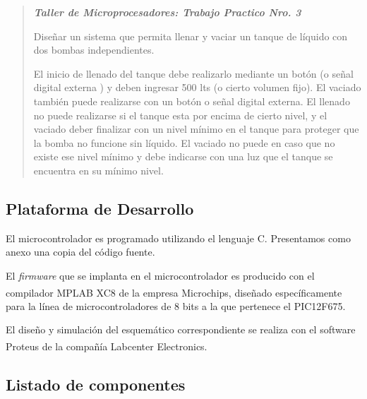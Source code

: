 \documentclass[a4paper]{article}
\let\originalcite\cite
\renewcommand{\cite}[2][]{\textsuperscript{\originalcite{#2}}}
\begin{document}
\begin{quotation}

    \begin{minipage}{\textwidth}

        \begin{center}
            \textit{\textbf{Taller de Microprocesadores: Trabajo 
            Practico Nro. 3}}
        \end{center}

        Diseñar un sistema que permita llenar y vaciar un tanque de líquido 
        con dos bombas independientes. 

        El inicio de llenado del tanque debe realizarlo mediante un botón 
        (o señal digital externa ) y deben ingresar 500 lts (o cierto volumen 
        fijo). El vaciado también puede realizarse con un botón o señal 
        digital externa. El llenado no puede realizarse si el tanque esta por 
        encima de cierto nivel, y el vaciado deber finalizar con un nivel 
        mínimo en el tanque para proteger que la bomba no funcione sin 
        líquido. El vaciado no puede en caso que no existe ese nivel mínimo y 
        debe indicarse con una luz que el tanque se encuentra en su mínimo 
        nivel.

    \end{minipage}

\end{quotation}

\subsection{Plataforma de Desarrollo}

El microcontrolador es programado utilizando el lenguaje C. 
Presentamos como anexo una copia del código fuente.

El \textit{firmware} que se implanta en el microcontrolador es  
producido con el compilador MPLAB XC8\cite{bib:compilador} de la 
empresa Microchips, diseñado específicamente para la línea de 
microcontroladores de 8 bits a la que pertenece el PIC12F675.

El diseño y simulación del esquemático correspondiente se realiza 
con el software Proteus\cite{bib:simulador} de la compañía 
Labcenter Electronics.

\subsection{Listado de componentes}
\end{document}
